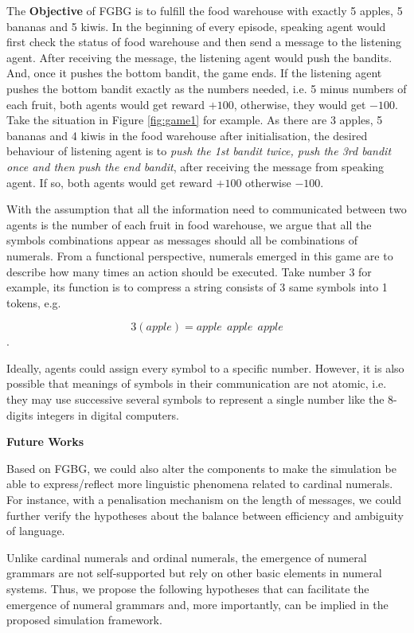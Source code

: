 \documentclass[a4paper,11pt]{article}
\begin{document}
The \textbf{Objective} of FGBG is to fulfill the food warehouse with exactly 5 apples, 5 bananas and 5 kiwis. In the beginning of every episode, speaking agent would first check the status of food warehouse and then send a message to the listening agent. After receiving the message, the listening agent would push the bandits. And, once it pushes the bottom bandit, the game ends. If the listening agent pushes the bottom bandit exactly as the numbers needed, i.e. 5 minus numbers of each fruit, both agents would get reward $+100$, otherwise, they would get $-100$. Take the situation in Figure \ref{fig:game1} for example. As there are 3 apples, 5 bananas and 4 kiwis in the food warehouse after initialisation, the desired behaviour of listening agent is to \textit{push the 1st bandit twice, push the 3rd bandit once and then push the end bandit}, after receiving the message from speaking agent. If so, both agents would get reward $+100$ otherwise $-100$.

With the assumption that all the information need to communicated between two agents is the number of each fruit in food warehouse, we argue that all the symbols combinations appear as messages should all be combinations of numerals. From a functional perspective, numerals emerged in this game are to describe how many times an action should be executed. Take number $3$ for example, its function is to compress a string consists of 3 same symbols into 1 tokens, e.g.

$$3(apple) = apple \ \ apple\ \ apple$$ .

Ideally, agents could assign every symbol to a specific number. However, it is also possible that meanings of symbols in their communication are not atomic, i.e. they may use successive several symbols to represent a single number like the 8-digits integers in digital computers.

\noindent\textbf{Future Works}

Based on FGBG, we could also alter the components to make the simulation be able to express/reflect more linguistic phenomena related to cardinal numerals. For instance, with a penalisation mechanism on the length of messages, we could further verify the hypotheses about the balance between efficiency and ambiguity of language.

\label{ssec:3.4garmmar_game}

Unlike cardinal numerals and ordinal numerals, the emergence of numeral grammars are not self-supported but rely on other basic elements in numeral systems. Thus, we propose the following hypotheses that can facilitate the emergence of numeral grammars and, more importantly, can be implied in the proposed simulation framework.
\end{document}
